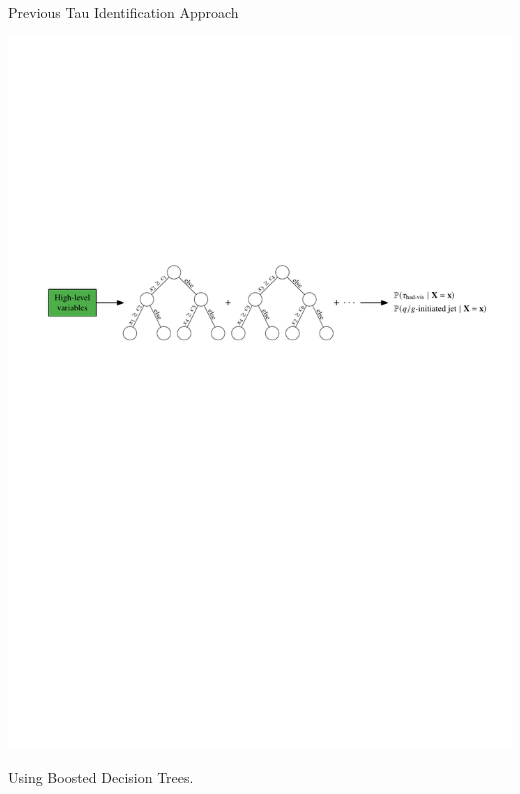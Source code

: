 \documentclass[11pt, xcolor={dvipsnames}, aspectratio=169]{beamer}
\begin{document}
\begin{frame}{Previous Tau Identification Approach}
    \begin{center}
    \includegraphics[scale=0.75]{tauid/bdt_approach}
  \end{center}

  Using Boosted Decision Trees.
\end{frame}

\end{document}
